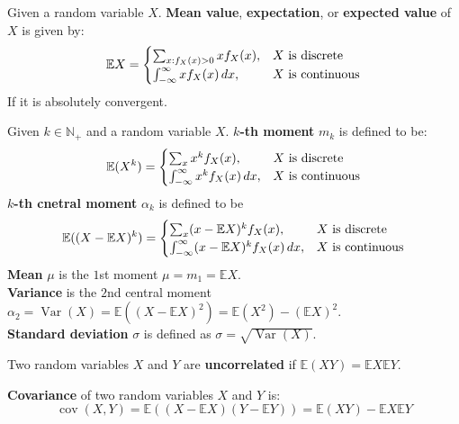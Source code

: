 \documentclass{huhtakm-template-book}
\newcommand{\expect}{\mathbb{E}}
\DeclareMathOperator{\Var}{Var}
\DeclareMathOperator{\cov}{cov}
\begin{document}
    \begin{sdefn}
        Given a random variable $X$. \textbf{Mean value}, \textbf{expectation}, or \textbf{expected value} of $X$ is given by:
        \begin{equation*}
            \expect X=\begin{cases}
                \sum_{x:f_{X}(x)>0}xf_{X}(x), &X\text{ is discrete}\\
                \intinfty xf_{X}(x)\,dx, &X\text{ is continuous}
            \end{cases}
        \end{equation*}
        If it is absolutely convergent.
    \end{sdefn}
    \begin{sdefn}
        Given $k\in\mathbb{N}_{+}$ and a random variable $X$. \textbf{$k$-th moment} $m_{k}$ is defined to be:
        \begin{equation*}
            \expect(X^{k})=\begin{cases}
                \sum_{x}x^{k}f_{X}(x), &X\text{ is discrete}\\
                \intinfty x^{k}f_{X}(x)\,dx, &X\text{ is continuous}
            \end{cases}
        \end{equation*}
        \textbf{$k$-th cnetral moment} $\alpha_{k}$ is defined to be
        \begin{equation*}
            \expect((X-\expect X)^{k})=\begin{cases}
                \sum_{x}(x-\expect X)^{k}f_{X}(x), &X\text{ is discrete}\\
                \intinfty(x-\expect X)^{k}f_{X}(x)\,dx, &X\text{ is continuous}
            \end{cases}
        \end{equation*}
        \textbf{Mean} $\mu$ is the $1$st moment $\mu=m_{1}=\expect X$.\\
        \textbf{Variance} is the $2$nd central moment $\alpha_{2}=\Var(X)=\expect((X-\expect X)^{2})=\expect(X^{2})-(\expect X)^{2}$.\\
        \textbf{Standard deviation} $\sigma$ is defined as $\sigma=\sqrt{\Var(X)}$.
    \end{sdefn}
    \begin{sdefn}
        Two random variables $X$ and $Y$ are \textbf{uncorrelated} if $\expect(XY)=\expect X\expect Y$.
    \end{sdefn}
    \begin{sdefn}
        \textbf{Covariance} of two random variables $X$ and $Y$ is:
        \begin{equation*}
            \cov(X,Y)=\expect((X-\expect X)(Y-\expect Y))=\expect(XY)-\expect X\expect Y
        \end{equation*}
    \end{sdefn}
\end{document}
